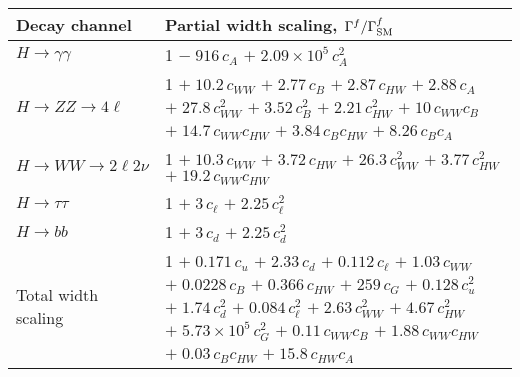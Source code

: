 \begin{tabular}{l|p{}}
    Decay channel & Partial width scaling, $\Gamma^f/\Gamma^f_{\rm{SM}}$ \\ \hline
    $H \rightarrow \gamma\gamma$ & 1 $-\;916\,c_{A}$ $+\;2.09\times 10^{5}\,c_{A}^{2}$ \\
    $H \rightarrow ZZ \rightarrow 4\ell$ & 1 $+\;10.2\,c_{WW}$ $+\;2.77\,c_{B}$ $+\;2.87\,c_{HW}$ $+\;2.88\,c_{A}$ $+\;27.8\,c_{WW}^{2}$ $+\;3.52\,c_{B}^{2}$ $+\;2.21\,c_{HW}^{2}$ $+\;10\,c_{WW}c_{B}$ $+\;14.7\,c_{WW}c_{HW}$ $+\;3.84\,c_{B}c_{HW}$ $+\;8.26\,c_{B}c_{A}$ \\
    $H \rightarrow WW \rightarrow 2\ell2\nu$ & 1 $+\;10.3\,c_{WW}$ $+\;3.72\,c_{HW}$ $+\;26.3\,c_{WW}^{2}$ $+\;3.77\,c_{HW}^{2}$ $+\;19.2\,c_{WW}c_{HW}$ \\
    $H \rightarrow \tau\tau$ & 1 $+\;3\,c_{\ell}$ $+\;2.25\,c_{\ell}^{2}$ \\
    $H \rightarrow bb$ & 1 $+\;3\,c_{d}$ $+\;2.25\,c_{d}^{2}$ \\
    \hline
    Total width scaling & 1 $+\;0.171\,c_{u}$ $+\;2.33\,c_{d}$ $+\;0.112\,c_{\ell}$ $+\;1.03\,c_{WW}$ $+\;0.0228\,c_{B}$ $+\;0.366\,c_{HW}$ $+\;259\,c_{G}$ $+\;0.128\,c_{u}^{2}$ $+\;1.74\,c_{d}^{2}$ $+\;0.084\,c_{\ell}^{2}$ $+\;2.63\,c_{WW}^{2}$ $+\;4.67\,c_{HW}^{2}$ $+\;5.73\times 10^{5}\,c_{G}^{2}$ $+\;0.11\,c_{WW}c_{B}$ $+\;1.88\,c_{WW}c_{HW}$ $+\;0.03\,c_{B}c_{HW}$ $+\;15.8\,c_{HW}c_{A}$ \\
\end{tabular}